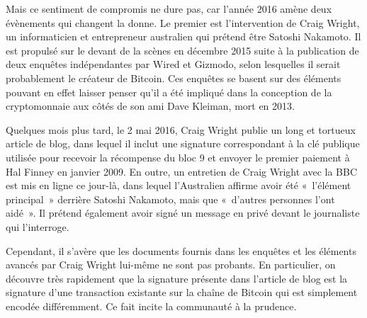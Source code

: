 Mais ce sentiment de compromis ne dure pas, car l'année 2016 amène deux évènements qui changent la donne. Le premier est l'intervention de Craig Wright, un informaticien et entrepreneur australien qui prétend être Satoshi Nakamoto. Il est propulsé sur le devant de la scènes en décembre 2015 suite à la publication de deux enquêtes indépendantes par Wired et Gizmodo, selon lesquelles il serait probablement le créateur de Bitcoin. Ces enquêtes se basent sur des éléments pouvant en effet laisser penser qu'il a été impliqué dans la conception de la cryptomonnaie aux côtés de son ami Dave Kleiman, mort en 2013.

Quelques mois plus tard, le 2 mai 2016, Craig Wright publie un long et tortueux article de blog, dans lequel il inclut une signature correspondant à la clé publique utilisée pour recevoir la récompense du bloc 9 et envoyer le premier paiement à Hal Finney en janvier 2009. En outre, un entretien de Craig Wright avec la BBC est mis en ligne ce jour-là, dans lequel l'Australien affirme avoir été «~l'élément principal~» derrière Satoshi Nakamoto, mais que «~d'autres personnes l'ont aidé~». Il prétend également avoir signé un message en privé devant le journaliste qui l'interroge.

Cependant, il s'avère que les documents fournis dans les enquêtes et les éléments avancés par Craig Wright lui-même ne sont pas probants. En particulier, on découvre très rapidement que la signature présente dans l'article de blog est la signature d'une transaction existante sur la chaîne de Bitcoin qui est simplement encodée différemment. Ce fait incite la communauté à la prudence.

